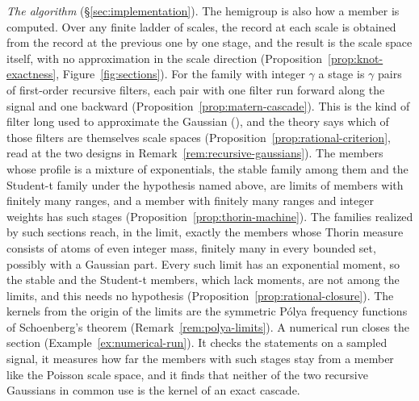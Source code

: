 \emph{The algorithm} (\S\ref{sec:implementation}). The hemigroup is also how a member is
computed. Over any finite ladder of scales, the record at each scale is obtained from the
record at the previous one by one stage, and the result is the scale space itself, with no
approximation in the scale direction (Proposition~\ref{prop:knot-exactness},
Figure~\ref{fig:sections}). For the \Matern{} family with integer $\gamma$ a stage is $\gamma$
pairs of first-order recursive filters, each pair with one filter run forward along the signal
and one backward (Proposition~\ref{prop:matern-cascade}). This is the kind of filter long used
to approximate the Gaussian (), and the
theory says which of those filters are themselves scale spaces
(Proposition~\ref{prop:rational-criterion}, read at the two designs in
Remark~\ref{rem:recursive-gaussians}). The members whose profile is a mixture of exponentials,
the stable family among them and the Student-t family under the hypothesis named above, are
limits of members with finitely many ranges, and a member with finitely many ranges and
integer weights has such stages (Proposition~\ref{prop:thorin-machine}). The families realized
by such sections reach, in the limit, exactly the members whose Thorin measure consists of
atoms of even integer mass, finitely many in every bounded set, possibly with a Gaussian part.
Every such limit has an exponential moment, so the stable and the Student-t members, which
lack moments, are not among the limits, and this needs no hypothesis
(Proposition~\ref{prop:rational-closure}). The kernels from the origin of the limits are the
symmetric P\'olya frequency functions of Schoenberg's theorem
(Remark~\ref{rem:polya-limits}). A numerical run closes the section
(Example~\ref{ex:numerical-run}). It checks the statements on a sampled signal, it measures
how far the members with such stages stay from a member like the Poisson scale space, and it
finds that neither of the two recursive Gaussians in common use is the kernel of an exact
cascade.

